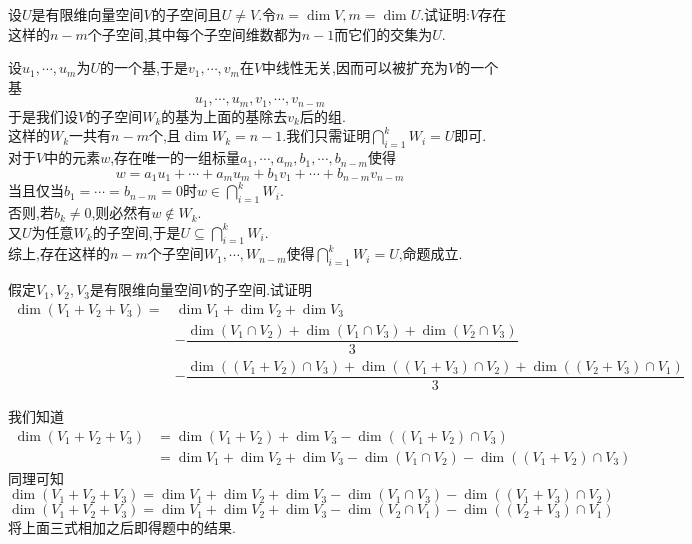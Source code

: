 \documentclass{ctexart}
\begin{document}
\begin{problem}[Example 4.]
    设$U$是有限维向量空间$V$的子空间且$U\neq V$.令$n=\dim V,m=\dim U$.试证明:$V$存在这样的$n-m$个子空间,其中每个子空间维数都为$n-1$而它们的交集为$U$.
\end{problem}
\begin{solution}[Proof.]
    设$u_1,\cdots,u_m$为$U$的一个基,于是$v_1,\cdots,v_m$在$V$中线性无关,因而可以被扩充为$V$的一个基
    $$u_1,\cdots,u_m,v_1,\cdots,v_{n-m}$$
    于是我们设$V$的子空间$W_k$的基为上面的基除去$v_k$后的组.\\
    这样的$W_k$一共有$n-m$个,且$\dim W_k=n-1$.我们只需证明$\displaystyle\bigcap_{i=1}^{k}W_i=U$即可.\\
    对于$V$中的元素$w$,存在唯一的一组标量$a_1,\cdots,a_m,b_1,\cdots,b_{n-m}$使得
    $$w=a_1u_1+\cdots+a_mu_m+b_1v_1+\cdots+b_{n-m}v_{n-m}$$
    当且仅当$b_1=\cdots=b_{n-m}=0$时$\displaystyle w\in\bigcap_{i=1}^{k}W_i$.\\
    否则,若$b_k\neq0$,则必然有$w\notin W_k$.\\
    又$U$为任意$W_k$的子空间,于是$U\subseteq\displaystyle\bigcap_{i=1}^{k}W_i$.\\
    综上,存在这样的$n-m$个子空间$W_1,\cdots,W_{n-m}$使得$\displaystyle\bigcap_{i=1}^{k}W_i=U$,命题成立.
\end{solution}
\begin{problem}[Example 5.]
    假定$V_1,V_2,V_3$是有限维向量空间$V$的子空间.试证明
    $$\begin{aligned}
        \dim(V_1+V_2+V_3)
        =&\dim V_1+\dim V_2+\dim V_3\\
        &-\dfrac{\dim(V_1\cap V_2)+\dim(V_1\cap V_3)+\dim(V_2\cap V_3)}{3}\\
        &-\dfrac{\dim\left((V_1+V_2)\cap V_3\right)+\dim\left((V_1+V_3)\cap V_2\right)+\dim\left((V_2+V_3)\cap V_1\right)}{3}
    \end{aligned}$$
\end{problem}
\begin{solution}[Proof.]
    我们知道
    $$\begin{aligned}
        \dim(V_1+V_2+V_3)
        &= \dim(V_1+V_2)+\dim V_3-\dim\left((V_1+V_2)\cap V_3\right)\\
        &= \dim V_1+\dim V_2+\dim V_3-\dim(V_1\cap V_2)-\dim\left((V_1+V_2)\cap V_3\right)
    \end{aligned}$$
    同理可知
    $$\dim(V_1+V_2+V_3)=\dim V_1+\dim V_2+\dim V_3-\dim(V_1\cap V_3)-\dim\left((V_1+V_3)\cap V_2\right)$$
    $$\dim(V_1+V_2+V_3)=\dim V_1+\dim V_2+\dim V_3-\dim(V_2\cap V_1)-\dim\left((V_2+V_3)\cap V_1\right)$$
    将上面三式相加之后即得题中的结果.
\end{solution}
\end{document}
